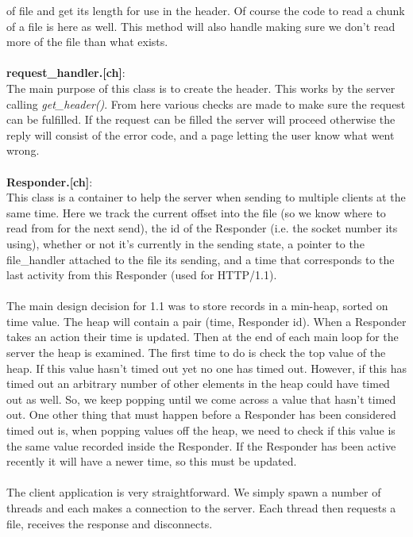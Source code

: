 \documentclass[10pt]{report}
\begin{document}
of file and get its length for use in the header. Of course the code
to read a chunk of a file is here as well. This method will also
handle making sure we don't read more of the file than what exists.\\\\
{\bf request\_handler.[ch]}:\\
The main purpose of this class is to create the header. This works by
the server calling \emph{get\_header()}. From here various checks are
made to make sure the request can be fulfilled. If the request can be
filled the server will proceed otherwise the reply will consist of the
error code, and a page letting the user know what went wrong.\\\\
{\bf Responder.[ch]}:\\
This class is a container to help the server when sending to multiple
clients at the same time. Here we track the current offset into the
file (so we know where to read from for the next send), the id of the
Responder (i.e. the socket number its using), whether or not it's
currently in the sending state, a pointer to the file\_handler
attached to the file its sending, and a time that corresponds to the
last activity from this Responder (used for HTTP/1.1).\\\\
The main design decision for 1.1 was to store records in a min-heap,
sorted on time value. The heap will contain a pair (time, Responder
id). When a Responder takes an action their time is updated. Then at
the end of each main loop for the server the heap is examined. The
first time to do is check the top value of the heap. If this value
hasn't timed out yet no one has timed out. However, if this has timed
out an arbitrary number of other elements in the heap could have timed
out as well. So, we keep popping until we come across a value that
hasn't timed out. One other thing that must happen before a Responder
has been considered timed out is, when popping values off the heap, we
need to check if this value is the same value recorded inside the
Responder. If the Responder has been active recently it will have a
newer time, so this must be updated.\\\\
The client application is very straightforward. We simply spawn a
number of threads and each makes a connection to the server. Each
thread then requests a file, receives the response and disconnects. 
\end{document}

